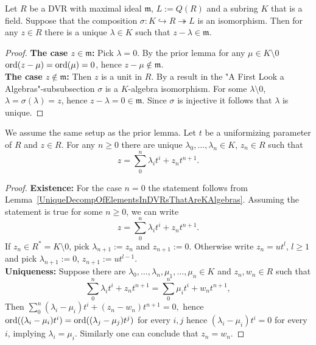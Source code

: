     \begin{lemma}\label{UniqueDecompOfElementsInDVRsThatAreKAlgebras}
        Let $R$ be a DVR with maximal ideal $\mathfrak{m}$, $L:=Q(R)$ and a subring $K$ that is a field. Suppose that the composition $\sigma: K \hookrightarrow R \twoheadrightarrow L$ is an isomorphism. Then for any $z\in R$ there is a unique $\lambda \in K$ such that $z-\lambda\in \mathfrak{m}$. 
    \end{lemma}
    \begin{proof}
        \textbf{The case $z\in \mathfrak{m}$:} Pick $\lambda =0$. By the prior lemma for any $\mu\in K\setminus0$ $\mathrm{ord}(z-\mu)=\mathrm{ord}(\mu)=0$, hence $z-\mu\notin \mathfrak{m}$.\\
        \textbf{The case $z\notin \mathfrak{m}$:} Then $z$ is a unit in $R$. By {\LARGE a result in the "A First Look a Algebras"-subsubsection} $\sigma$ is a $K$-algebra isomorphism. For some $\lambda \setminus 0$, $\lambda =\sigma(\lambda)=z$, hence $z-\lambda =0\in \mathfrak{m}$. Since $\sigma$ is injective it follows that $\lambda$ is unique. 
    \end{proof}
    \begin{proposition}\label{PropositionTowardsPowerSeriesDescriptionOfCerationDVRs}
        We assume the same setup as the prior lemma. Let $t$ be a uniformizing parameter of $R$ and $z\in R$. For any $n\geq 0$ there are unique $\lambda_0,\dots,\lambda_n\in K$, $z_{n}\in R$ such that 
        $$z = \sum_0^n \lambda_it^i + z_nt^{n+1}.$$
    \end{proposition}
    \begin{proof}
        \textbf{Existence:} For the case $n=0$ the statement follows from Lemma~\ref{UniqueDecompOfElementsInDVRsThatAreKAlgebras}. Assuming the statement is true for some $n\geq0$, we can write 
        $$z = \sum_0^n \lambda_it^i+z_nt^{n+1}.$$
        If $z_n \in R^\ast = K\setminus 0$, pick $\lambda_{n+1} := z_n$ and $z_{n+1}:=0$. Otherwise write $z_n = ut^l$, $l\geq 1$ and pick $\lambda_{n+1}:=0$, $z_{n+1} := ut^{l-1}$.\\
        \textbf{Uniqueness:} Suppose there are $\lambda_0,\dots,\lambda_n,\mu_1,\dots,\mu_n\in K$ and $z_n,w_n\in R$ such that 
        $$\sum_0^n \lambda_it^i +z_nt^{n+1} = \sum_0^n \mu_it^i +w_nt^{n+1},$$
        Then $\sum_0^n (\lambda_i-\mu_i)t^i + (z_n-w_n)t^{n+1}=0,$
        hence $\mathrm{ord}((\lambda_i-\mu_i)t^i)=\mathrm{ord}((\lambda_j-\mu_j)t^j)$ for every $i,j$ hence $(\lambda_i-\mu_i)t^i=0$ for every $i$, implying $\lambda_i=\mu_i$. Similarly one can conclude that $z_n=w_n$.  
    \end{proof}
